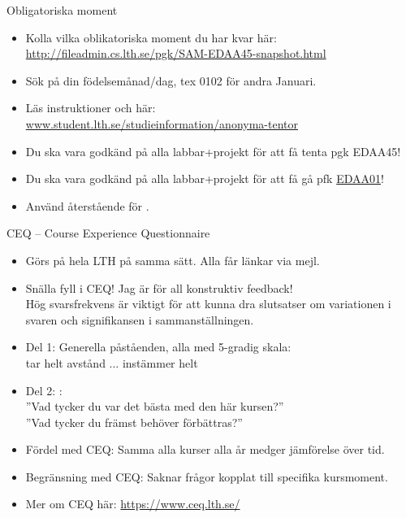 
\begin{Slide}{Obligatoriska moment}\SlideFontSmall
\begin{itemize}
\item Kolla vilka oblikatoriska moment du har kvar här:
\url{http://fileadmin.cs.lth.se/pgk/SAM-EDAA45-snapshot.html}
\item Sök på din födelsemånad/dag, tex 0102 för andra Januari.
\item Läs  instruktioner  och  här: \\
\href{http://www.student.lth.se/studieinformation/anonyma-tentor/}{www.student.lth.se/studieinformation/anonyma-tentor}
\item Du ska vara godkänd på alla labbar+projekt för att få tenta pgk EDAA45!
\item Du ska vara godkänd på alla labbar+projekt för att få gå pfk \href{http://cs.lth.se/edaa01vt}{EDAA01}!
\item Använd återstående  för .
\end{itemize}
\end{Slide}

\begin{Slide}{CEQ -- Course Experience Questionnaire}\SlideFontSmall
\begin{itemize}
\item Görs på hela LTH på samma sätt. Alla får länkar via mejl.
\item Snälla fyll i CEQ! Jag är  för all konstruktiv feedback! \\ Hög svarsfrekvens är viktigt för att kunna dra slutsatser om variationen i svaren och signifikansen i sammanställningen.
\item Del 1: Generella påståenden, alla med 5-gradig skala: \\ tar helt avstånd ... instämmer helt
\item Del 2: : \\
''Vad  tycker  du  var  det  bästa  med  den här  kursen?'' \\
''Vad  tycker  du  främst  behöver  förbättras?''
\item Fördel med CEQ: Samma alla kurser alla år medger jämförelse över tid.
\item Begränsning med CEQ: Saknar frågor kopplat till specifika kursmoment.
\item Mer om CEQ här: \url{https://www.ceq.lth.se/}
\end{itemize}
\end{Slide}

